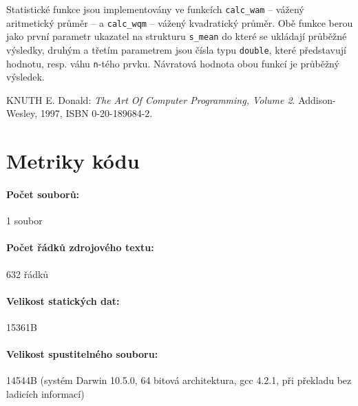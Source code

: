\documentclass[12pt,a4paper,titlepage,final]{article}
\begin{document}
Statistické funkce jsou implementovány ve funkcích \texttt{calc\_wam} -- vážený
aritmetický průměr -- a \texttt{calc\_wqm} -- vážený kvadratický průměr. Obě funkce
berou jako první parametr ukazatel na strukturu \texttt{s\_mean} do které se ukládají
průběžné výsledky, druhým a třetím parametrem jsou čísla typu \texttt{double}, které
představují hodnotu, resp. váhu \texttt{n}-tého prvku. Návratová hodnota obou funkcí
je průběžný výsledek.



\begin{thebibliography}{1}

KNUTH E. Donald: \emph{The Art Of Computer Programming, Volume 2}.
Addison-Wesley, 1997, ISBN 0-20-189684-2.

\end{thebibliography}
\appendix

\section{Metriky kódu} \label{metriky}
\paragraph{Počet souborů:} 1 soubor
\paragraph{Počet řádků zdrojového textu:} 632 řádků
\paragraph{Velikost statických dat:} 15361B
\paragraph{Velikost spustitelného souboru:} 14544B (systém Darwin 10.5.0, 64 bitová
architektura, gcc 4.2.1, při překla\-du bez ladicích informací)
\end{document}
